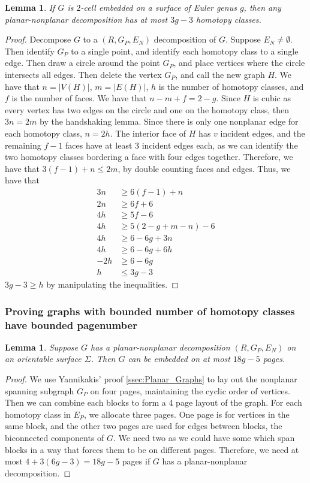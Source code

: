 \documentclass[]{report}
\newtheorem{lemma}[theorem]{Lemma}
\theoremstyle{definition}
\numberwithin{theorem}{section}
\numberwithin{equation}{section}
\begin{document}
\begin{lemma}
	If $G$ is $2$-cell embedded on a surface of Euler genus $g$, then any planar-nonplanar decomposition has at most $3g-3$ homotopy classes. 
\end{lemma}
\begin{proof}
	Decompose $G$ to a $(R, G_P, E_N)$ decomposition of $G$. Suppose $E_N \neq \emptyset$. Then identify $G_P$ to a single point, and identify each homotopy class to a single edge. Then draw a circle around the point $G_P$, and place vertices where the circle intersects all edges. Then delete the vertex $G_P$, and call the new graph $H$. We have that $n = |V(H)|$, $m = |E(H)|$, $h$ is the number of homotopy classes, and $f$ is the number of faces. We have that $n - m + f = 2 - g$. Since $H$ is cubic as every vertex has two edges on the circle and one on the homotopy class, then $3n = 2m$ by the handshaking lemma. Since there is only one nonplanar edge for each homotopy class, $n = 2h$. The interior face of $H$ has $v$ incident edges, and the remaining $f-1$ faces have at least 3 incident edges each, as we can identify the two homotopy classes bordering a face with four edges together. Therefore, we have that $3(f-1) + n \leq 2m$, by double counting faces and edges. Thus, we have that
	\begin{align*}
	3n &\geq 6(f - 1) + n\\
	2n &\geq 6f + 6\\
	4h &\geq 5 f - 6\\
	4h &\geq 5(2 - g + m - n) - 6\\
	4h &\geq 6 - 6g + 3n\\
	4h &\geq 6 - 6g + 6h\\
	-2h &\geq 6 - 6g\\
	h &\leq 3g - 3
	\end{align*}
	$3g - 3 \geq h$ by manipulating the inequalities. 
\end{proof}

\subsubsection{Proving graphs with bounded number of homotopy classes have bounded pagenumber}\label{sssec:bounded_pagenumber_homotopy}
\begin{lemma}\label{lem:planar_nonplanar_orientable}
	Suppose $G$ has a planar-nonplanar decomposition $(R, G_P, E_N)$ on an orientable surface $\Sigma$. Then $G$ can be embedded on at most $18g - 5$ pages.
\end{lemma}
\begin{proof}
	We use Yannikakis' proof \cref{ssec:Planar_Graphs} to lay out the nonplanar spanning subgraph $G_P$ on four pages, maintaining the cyclic order of vertices. Then we can combine each blocks to form a 4 page layout of the graph. For each homotopy class in $E_P$, we allocate three pages. One page is for vertices in the same block, and the other two pages are used for edges between blocks, the biconnected components of $G$. We need two as we could have some which span blocks in a way that forces them to be on different pages. Therefore, we need at most $4 + 3(6g - 3) = 18g-5$ pages if $G$ has a planar-nonplanar decomposition. 
\end{proof}
\end{document}
